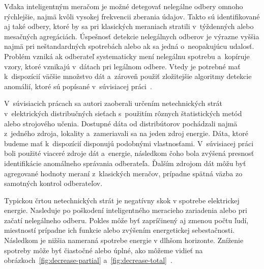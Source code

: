\documentclass[a4paper,twoside,slovak,12pt,appendix]{article}
\begin{document}
Vďaka inteligentným meračom je možné detegovať nelegálne odbery omnoho
rýchlejšie, najmä kvôli vysokej frekvencii zberania údajov. Takto sú
identifikované aj také odbery, ktoré by sa pri klasických meraniach stratili
v~týždenných alebo mesačných agregáciách. Úspešnosť detekcie nelegálnych odberov
je výrazne vyššia najmä pri neštandardných spotrebách alebo ak sa jedná
o~neopakujúcu udalosť. Problém vzniká ak odberateľ systematicky mení
nelegálnu spotrebu a~kopíruje vzory, ktoré vznikajú v~dátach pri legálnom
odbere. Vtedy je potrebné mať k~dispozícií väčšie množstvo dát a~zároveň použiť
zložitejšie algoritmy detekcie anomálií, ktoré sú popísané v~súvisiacej
práci~\cite{Nikovski2013}.

V~súvisiacich prácach sa autori zaoberali určením netechnických strát
v~elektrických distribučných sieťach s~použitím rôznych štatistických metód
alebo strojového učenia. Dostupné dáta od distribútorov pochádzali najmä
z~jedného zdroja, lokality a~zameriavali sa na jeden zdroj energie. Dáta, ktoré
budeme mať k~dispozícií disponujú podobnými vlastnosťami. V~súvisiacej
práci~\cite{Coma-Puig2016} boli použité viaceré zdroje dát a~energie, následkom
čoho bola zvýšená presnosť identifikácie anomálneho správania odberateľa.
Ďalším zdrojom dát môžu byť agregované hodnoty meraní z~klasických meračov,
prípadne spätná väzba zo samotných kontrol odberateľov.

Typickou črtou netechnických strát je negatívny skok v spotrebe elektrickej
energie. Nasleduje po poškodení inteligentného meracieho zariadenia alebo pri
začatí nelegálneho odberu. Pokles môže byť zapríčinený aj zmenou počtu ľudí,
miestností prípadne ich funkcie alebo zvýšením energetickej sebestačnosti.
Následkom je nižšia nameraná spotrebe energie v dlhšom horizonte. Zníženie
spotreby môže byť čiastočné alebo úplné, ako môžeme
vidieť na obrázkoch~\ref{fig:decrease-partial}
a~\ref{fig:decrease-total}~\cite{Spiric2015,Trevizan2015}.
\end{document}
